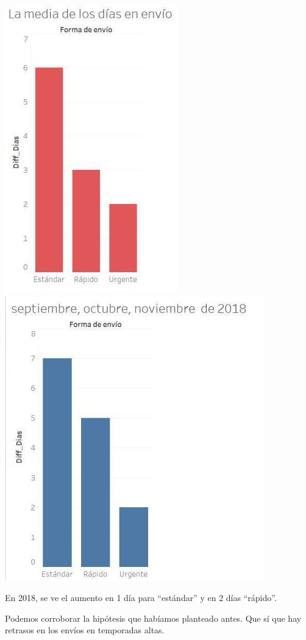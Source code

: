 \documentclass{article}
\begin{document}
\includegraphics[scale=0.25]{imagenes/Media2018.jpg} 
\includegraphics[scale=0.25]{imagenes/TA2018.jpg}

En 2018, se ve el aumento en 1 día para “estándar” y en 2 días “rápido”. 

Podemos corroborar la hipótesis que habíamos planteado antes. Que sí que hay retrasos en los envíos en temporadas altas.
\end{document}
